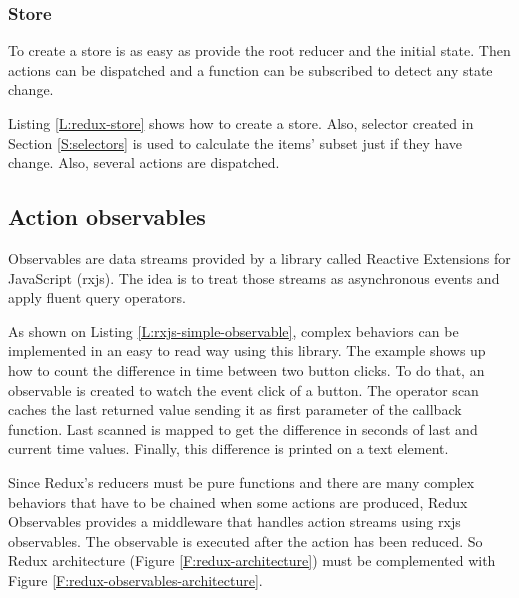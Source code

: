 \subsubsection{Store}

To create a store is as easy as provide the root reducer and the initial state.
Then actions can be dispatched and a function can be subscribed to detect any
state change.

Listing \ref{L:redux-store} shows how to create a store. Also,
selector created in Section \ref{S:selectors} is used to calculate the items'
subset just if they have change. Also, several actions are dispatched.

\begin{codefigure}
\end{codefigure}

\subsection{Action observables}

Observables are data streams provided by a library called Reactive Extensions
for JavaScript (rxjs). The idea is to treat those streams as asynchronous 
events and apply fluent query operators.

\begin{codefigure}
\end{codefigure}

As shown on Listing \ref{L:rxjs-simple-observable}, complex behaviors can be
implemented in an easy to read way using this library. The example shows up
how to count the difference in time between two button clicks. To do that, 
an observable is created to watch the event click of a button. The operator scan
caches the last returned value sending it as first parameter of the callback
function. Last scanned is mapped to get the difference in seconds of last
and current time values. Finally, this difference is printed on a text element.

Since Redux's reducers must be pure functions and there are many complex
behaviors that have to be chained when some actions are produced, Redux
Observables provides a middleware that handles action streams using rxjs
observables. The observable is executed after the action has been reduced.
So Redux architecture (Figure \ref{F:redux-architecture}) must be complemented 
with Figure \ref{F:redux-observables-architecture}.

